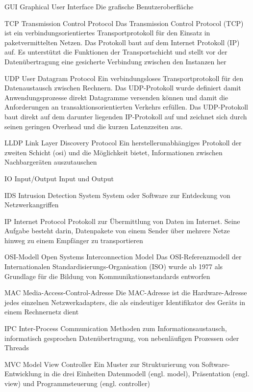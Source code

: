 
	{GUI}
	{Graphical User Interface}
	{Die grafische Benutzeroberfläche}

	{TCP}
	{Transmission Control Protocol}
	{Das Transmission Control Protocol (TCP) ist ein verbindungsorientiertes Transportprotokoll für den Einsatz in paketvermittelten Netzen. Das Protokoll baut auf dem Internet Protokoll (IP) auf. Es unterstützt die Funktionen der Transportschicht und stellt vor der Datenübertragung eine gesicherte Verbindung zwischen den Instanzen her}

	{UDP}
	{User Datagram Protocol}
	{Ein verbindungsloses Transportprotokoll für den Datenaustausch zwischen Rechnern. Das UDP-Protokoll wurde definiert damit Anwendungsprozesse direkt Datagramme versenden können und damit die Anforderungen an transaktionsorientierten Verkehrs erfüllen. Das UDP-Protokoll baut direkt auf dem darunter liegenden IP-Protokoll auf und zeichnet sich durch seinen geringen Overhead und die kurzen Latenzzeiten aus.}

	{LLDP}
	{Link Layer Discovery Protocol}
	{Ein herstellerunabhängiges Protokoll der zweiten Schicht (\gls{osi}) und die Möglichkeit bietet, Informationen zwischen Nachbargeräten auszutauschen}

	{IO}
	{Input/Output}
	{Input und Output}


	{IDS}
	{Intrusion Detection System}
	{System oder Software zur Entdeckung von Netzwerkangriffen}


	{IP}
	{Internet Protocol}
	{Protokoll zur Übermittlung von Daten im Internet. Seine Aufgabe besteht darin, Datenpakete von einem Sender über mehrere Netze hinweg zu einem Empfänger zu transportieren}

	{OSI-Modell}
	{Open Systems Interconnection Model}
	{Das OSI-Referenzmodell der Internationalen Standardisierungs-Organisation (ISO) wurde ab 1977 als Grundlage für die Bildung von Kommunikationsstandards entworfen}


	{MAC}
	{Media-Access-Control-Adresse}
	{Die MAC-Adresse ist die Hardware-Adresse jedes einzelnen Netzwerkadapters, die als eindeutiger Identifikator des Geräts in einem Rechnernetz dient}


	{IPC}
	{Inter-Process Communication}
	{Methoden zum Informationsaustausch, informatisch gesprochen Datenübertragung, von nebenläufigen Prozessen oder Threads}


	{MVC}
	{Model View Controller}
	{Ein Muster zur Strukturierung von Software-Entwicklung in die drei Einheiten Datenmodell (engl. model), Präsentation (engl. view) und Programmsteuerung (engl. controller)}


